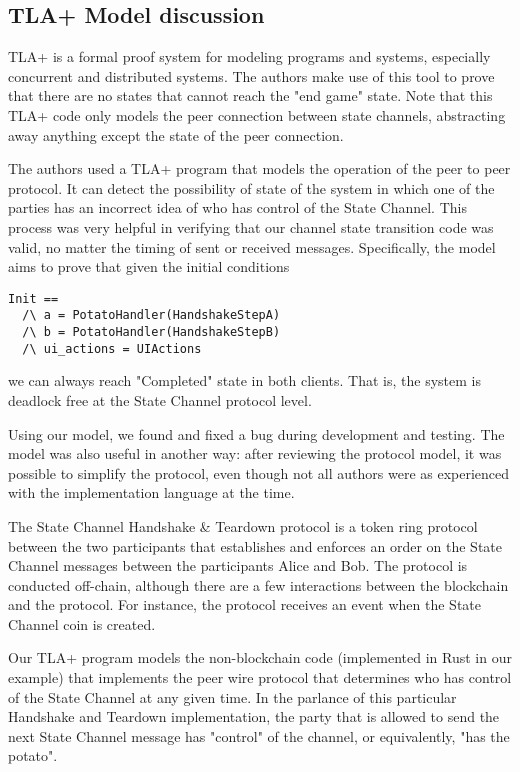 \documentclass[a4paper]{article}
\begin{document}
\begin{multicols}{2}
\section{TLA+ Model discussion}

TLA+ \cite{2} is a formal proof system for modeling programs and systems, especially concurrent and distributed systems. The authors make use of this tool to prove that there are no states that cannot reach the "end game" state. Note that this TLA+ code only models the peer connection between state channels, abstracting away anything except the state of the peer connection.

The authors used a TLA+ program that models the operation of the peer to peer protocol. It can detect the possibility of state of the system in which one of the parties has an incorrect idea of who has control of the State Channel. This process was very helpful in verifying that our channel state transition code was valid, no matter the timing of sent or received messages. Specifically, the model aims to prove that given the initial conditions 

\begin{verbatim}
Init ==
  /\ a = PotatoHandler(HandshakeStepA)
  /\ b = PotatoHandler(HandshakeStepB)
  /\ ui_actions = UIActions
\end{verbatim}

we can always reach "Completed" state in both clients. That is, the system is deadlock free at the State Channel protocol level.

Using our model, we found and fixed a bug during development and testing. The model was also useful in another way: after reviewing the protocol model, it was possible to simplify the protocol, even though not all authors were as experienced with the implementation language at the time.

The State Channel Handshake \& Teardown protocol is a token ring protocol between the two participants that establishes and enforces an order on the State Channel messages between the participants Alice and Bob. The protocol is conducted off-chain, although there are a few interactions between the blockchain and the protocol. For instance, the protocol receives an event when the State Channel coin is created.

Our TLA+ program models the non-blockchain code (implemented in Rust in our example) that implements the peer wire protocol that determines who has control of the State Channel at any given time. In the parlance of this particular Handshake and Teardown implementation, the party that is allowed to send the next State Channel message has "control" of the channel, or equivalently, "has the potato".


\end{multicols}
\end{document}
